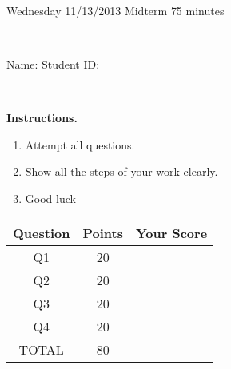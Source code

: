 \documentclass[12pt, oneside]{amsart}
\newcommand{\one}{20}
\newcommand{\two}{20}
\newcommand{\three}{20}
\newcommand{\four}{20}
\begin{document}
%

\begin{center}
    \hrulefill\\
    {\bf \textsf{\raisebox{-0.10cm}{Fall 2013: MATH 280} \hspace{\fill} 
            \raisebox{-0.10cm}{Numerical Analysis} \hspace{\fill}
            \raisebox{-0.10cm}{David Karapetyan}}}\\
    \hrulefill\\
    {\large \rule{0cm}{1.2cm} \textsf{Wednesday 11/13/2013} \hfill
        \textsf{Midterm} \hfill  \textsf{75 minutes}}\\
    {\large\rule{0cm}{1.2cm}\textsf{Name: \framebox[2.9in]{\rule{0cm}{0.8cm}} 
            \hspace{\fill}
            Student ID: \framebox[2.1in]{\rule{0cm}{0.8cm}}}}\\
\end{center}
\vspace{0.8cm}

\noindent
{\bf \textsf{Instructions.}}

\begin{enumerate}
    \item Attempt all questions.   
    \item Show all the steps of your work clearly.  
    \item Good luck 
\end{enumerate}

\vfill


\begin{center}
    {\large
        \begin{tabular}{|c|c|c|}
            \hline
            \rule[-0.3cm]{0cm}{1cm}
            \textsf{Question} & \textsf{Points} &  \textsf{Your Score} \\
            \hline
            \hline
            \rule[-0.3cm]{0cm}{1cm}
            \textsf{Q1} & \one &\\
            \hline
            \rule[-0.3cm]{0cm}{1cm}
            \textsf{Q2} & \two &\\
            \hline
            \rule[-0.3cm]{0cm}{1cm}
            \textsf{Q3} & \three &\\
            \hline
            \rule[-0.3cm]{0cm}{1cm}
            \textsf{Q4} & \four &\\
            \hline
            \rule[-0.3cm]{0cm}{1cm}
            \textsf{TOTAL} & 80 & \\
            \hline
        \end{tabular}
    } 

\end{center}
\end{document}
